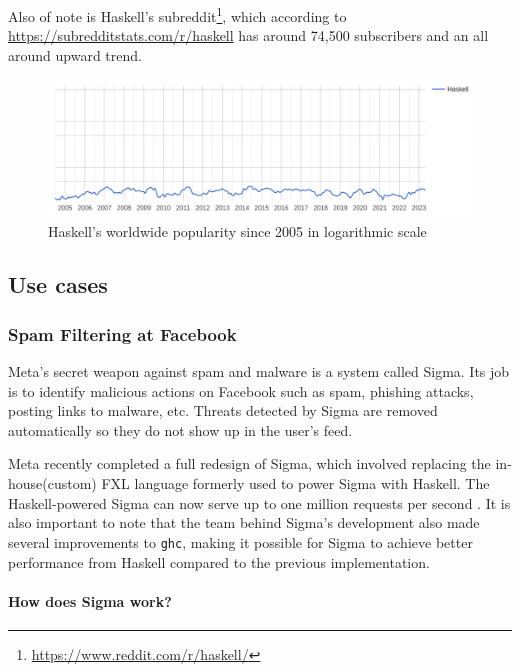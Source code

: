 \documentclass[a4paper, titlepage, twoside]{article}
\begin{document}
Also of note is Haskell's subreddit\footnote{\url{https://www.reddit.com/r/haskell/}}, which according to \url{https://subredditstats.com/r/haskell} has around 74,500 subscribers and an all around upward trend.

\begin{figure}[htbp]
\centering
\includegraphics[width=.9\linewidth]{img/2023-05-18_17-15-08_screenshot.png}
\caption{\label{fig:org6de6701}Haskell's worldwide popularity since 2005 in logarithmic scale \autocite{carbonnellePYPLPopularitYProgramming2023}}
\end{figure}

\subsection{Use cases}
\label{sec:org359007e}

\subsubsection{Spam Filtering at Facebook}
\label{sec:org464f473}

Meta's secret weapon against spam and malware is a system called Sigma. Its job is to identify malicious actions on Facebook such as spam, phishing attacks, posting links to malware, etc. Threats detected by Sigma are removed automatically so they do not show up in the user's feed.

Meta recently completed a full redesign of Sigma, which involved replacing the in-house(custom) FXL language formerly used to power Sigma with Haskell. The Haskell-powered Sigma can now serve up to one million requests per second \autocite{marlowFightingSpamHaskell2015}. It is also important to note that the team behind Sigma's development also made several improvements to \texttt{ghc}, making it possible for Sigma to achieve better performance from Haskell compared to the previous implementation.

\paragraph*{How does Sigma work?}
\label{sec:orgb662bce}
\end{document}
